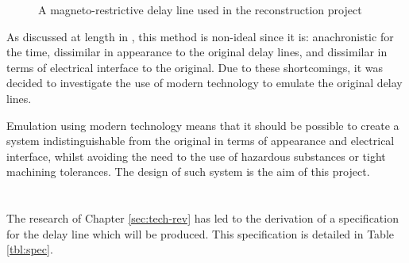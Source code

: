 \begin{figure}[ht]
	\centering
	\caption{A magneto-restrictive delay line used in the reconstruction project \cite{linnington2016}}
	\label{fig:nickel-delay}
\end{figure}

As discussed at length in \cite{tyler2017}, this method is non-ideal since it is: anachronistic for the time, dissimilar in appearance to the original delay lines, and dissimilar in terms of electrical interface to the original. Due to these shortcomings, it was decided to investigate the use of modern technology to emulate the original delay lines.

Emulation using modern technology means that it should be possible to create a system indistinguishable from the original in terms of appearance and electrical interface, whilst avoiding the need to the use of hazardous substances or tight machining tolerances. The design of such system is the aim of this project.

\chapter{} \label{sec:spec}

The research of Chapter \ref{sec:tech-rev} has led to the derivation of a specification for the delay line which will be produced. This specification is detailed in Table \ref{tbl:spec}.

